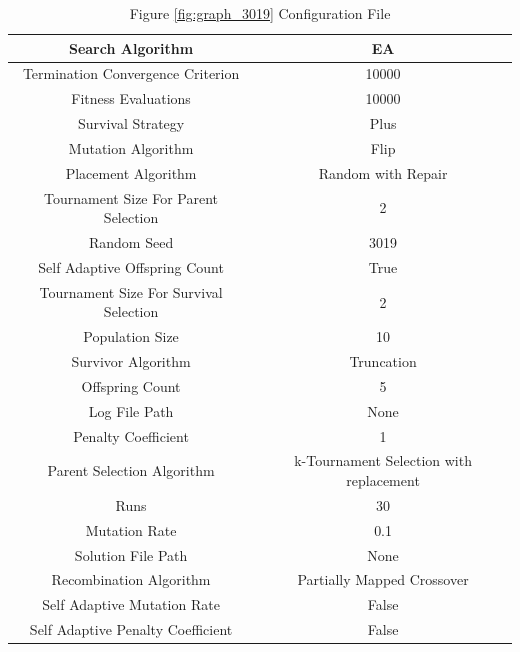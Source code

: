 \documentclass{standalone}
\begin{document}
\begin{table}[!htb]
	\centering
	\caption{Figure \ref{fig:graph_3019} Configuration File}
	\label{tab:graph_3019}
	\begin{tabular}{| c | c |}
		\hline
		Search Algorithm		& EA		 \\
		\hline
		Termination Convergence Criterion		& 10000		 \\
		\hline
		Fitness Evaluations		& 10000		 \\
		\hline
		Survival Strategy		& Plus		 \\
		\hline
		Mutation Algorithm		& Flip		 \\
		\hline
		Placement Algorithm		& Random with Repair		 \\
		\hline
		Tournament Size For Parent Selection		& 2		 \\
		\hline
		Random Seed		& 3019		 \\
		\hline
		Self Adaptive Offspring Count		& True		 \\
		\hline
		Tournament Size For Survival Selection		& 2		 \\
		\hline
		Population Size		& 10		 \\
		\hline
		Survivor Algorithm		& Truncation		 \\
		\hline
		Offspring Count		& 5		 \\
		\hline
		Log File Path		& None		 \\
		\hline
		Penalty Coefficient		& 1		 \\
		\hline
		Parent Selection Algorithm		& k-Tournament Selection with replacement		 \\
		\hline
		Runs		& 30		 \\
		\hline
		Mutation Rate		& 0.1		 \\
		\hline
		Solution File Path		& None		 \\
		\hline
		Recombination Algorithm		& Partially Mapped Crossover		 \\
		\hline
		Self Adaptive Mutation Rate		& False		 \\
		\hline
		Self Adaptive Penalty Coefficient		& False		 \\
		\hline
	\end{tabular}
\end{table}
\end{document}
